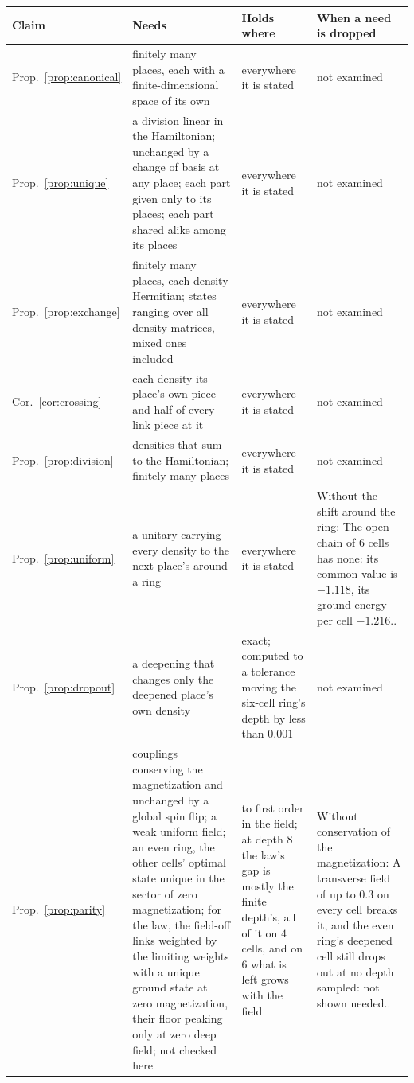 \begin{tabular}{lp{1.75in}p{1.5in}p{2.25in}}
\toprule
Claim & \raggedright Needs & \raggedright Holds where & \raggedright When a need is dropped \tabularnewline
\midrule
Prop.~\ref{prop:canonical} & \raggedright finitely many places, each with a finite-dimensional space of its own & \raggedright everywhere it is stated & \raggedright not examined \tabularnewline
Prop.~\ref{prop:unique} & \raggedright a division linear in the Hamiltonian; unchanged by a change of basis at any place; each part given only to its places; each part shared alike among its places & \raggedright everywhere it is stated & \raggedright not examined \tabularnewline
Prop.~\ref{prop:exchange} & \raggedright finitely many places, each density Hermitian; states ranging over all density matrices, mixed ones included & \raggedright everywhere it is stated & \raggedright not examined \tabularnewline
Cor.~\ref{cor:crossing} & \raggedright each density its place's own piece and half of every link piece at it & \raggedright everywhere it is stated & \raggedright not examined \tabularnewline
Prop.~\ref{prop:division} & \raggedright densities that sum to the Hamiltonian; finitely many places & \raggedright everywhere it is stated & \raggedright not examined \tabularnewline
Prop.~\ref{prop:uniform} & \raggedright a unitary carrying every density to the next place's around a ring & \raggedright everywhere it is stated & \raggedright Without the shift around the ring: The open chain of $6$ cells has none: its common value is $-1.118$, its ground energy per cell $-1.216$.. \tabularnewline
Prop.~\ref{prop:dropout} & \raggedright a deepening that changes only the deepened place's own density & \raggedright exact; computed to a tolerance moving the six-cell ring's depth by less than $0.001$ & \raggedright not examined \tabularnewline
Prop.~\ref{prop:parity} & \raggedright couplings conserving the magnetization and unchanged by a global spin flip; a weak uniform field; an even ring, the other cells' optimal state unique in the sector of zero magnetization; for the law, the field-off links weighted by the limiting weights with a unique ground state at zero magnetization, their floor peaking only at zero deep field; not checked here & \raggedright to first order in the field; at depth $8$ the law's gap is mostly the finite depth's, all of it on $4$ cells, and on $6$ what is left grows with the field & \raggedright Without conservation of the magnetization: A transverse field of up to $0.3$ on every cell breaks it, and the even ring's deepened cell still drops out at no depth sampled: not shown needed.. \tabularnewline

\end{tabular}
